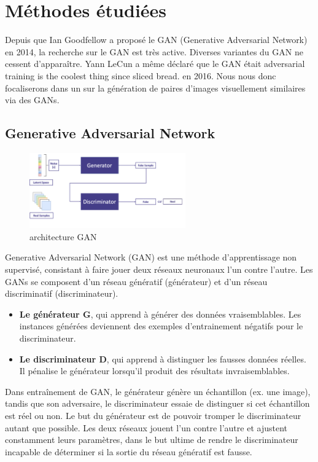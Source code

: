 \chapter{Méthodes étudiées}
Depuis que Ian Goodfellow a proposé le GAN (Generative Adversarial Network) en 2014, la recherche sur le GAN est très active. Diverses variantes du GAN ne cessent d'apparaître. Yann LeCun a même déclaré que le GAN était \og{}adversarial training is the coolest thing since sliced bread.\fg{} en 2016. Nous nous donc focaliserons dans un sur la génération de paires d'images visuellement similaires via des GANs.

\section{Generative Adversarial Network}

\begin{figure}[H] 
	\centering 
	\includegraphics[width=0.6\textwidth]{./resources/img/GAN.png} %
	\caption{architecture GAN} %
	\label{Fig3_1} %
\end{figure}

Generative Adversarial Network (GAN) est une méthode d'apprentissage non supervisé, consistant à faire jouer deux réseaux neuronaux l'un contre l'autre. Les GANs se composent d'un réseau génératif (générateur)  et d'un réseau discriminatif (discriminateur). 

\begin{itemize}
	\item \textbf{Le générateur G}, qui apprend à générer des données vraisemblables. Les instances générées deviennent des exemples d'entrainement négatifs pour le discriminateur.
	\item \textbf{Le discriminateur D}, qui apprend à distinguer les fausses données réelles. Il pénalise le générateur lorsqu'il produit des résultats invraisemblables.
\end{itemize}


Dans entraînement de GAN, le générateur génère un échantillon (ex. une image), tandis que son adversaire, le discriminateur essaie de distinguer si cet échantillon est réel ou non. Le but du générateur est de pouvoir tromper le discriminateur autant que possible. Les deux réseaux jouent l'un contre l'autre et ajustent constamment leurs paramètres, dans le but ultime de rendre le discriminateur incapable de déterminer si la sortie du réseau génératif est fausse. 

